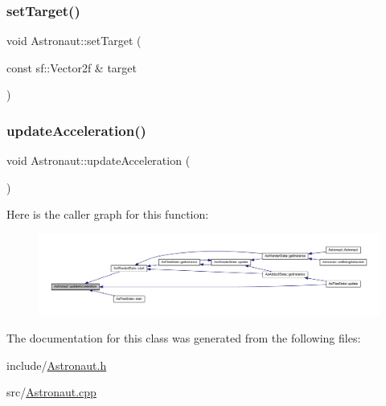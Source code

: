 \subsubsection{\texorpdfstring{set\+Target()}{setTarget()}}
{\footnotesize\ttfamily void Astronaut\+::set\+Target (\begin{DoxyParamCaption}\item[{const sf\+::\+Vector2f \&}]{target }\end{DoxyParamCaption})}

\mbox{\label{class_astronaut_a1f4a85a0c38a73e1370528039535712b}} 
\subsubsection{\texorpdfstring{update\+Acceleration()}{updateAcceleration()}}
{\footnotesize\ttfamily void Astronaut\+::update\+Acceleration (\begin{DoxyParamCaption}{ }\end{DoxyParamCaption})}

Here is the caller graph for this function\+:
\nopagebreak
\begin{figure}[H]
\begin{center}
\leavevmode
\includegraphics[width=350pt]{class_astronaut_a1f4a85a0c38a73e1370528039535712b_icgraph}
\end{center}
\end{figure}


The documentation for this class was generated from the following files\+:\begin{DoxyCompactItemize}
\item 
include/\hyperlink{_astronaut_8h}{Astronaut.\+h}\item 
src/\hyperlink{_astronaut_8cpp}{Astronaut.\+cpp}\end{DoxyCompactItemize}
